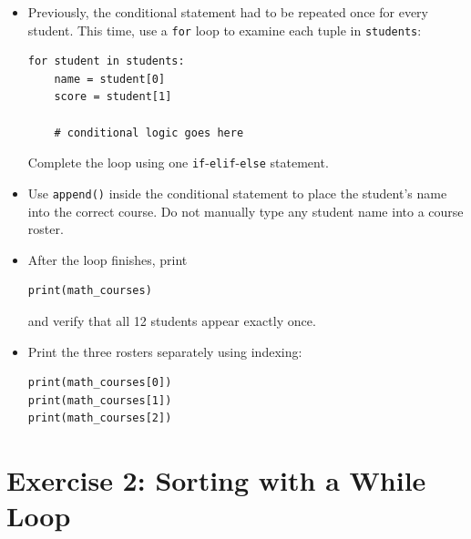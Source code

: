 \documentclass{article}
\begin{document}
\begin{enumerate}
\begin{itemize}
\item Previously, the conditional statement had to be
repeated once for every student.  This time, use a
\texttt{for} loop to examine each tuple in
\texttt{students}:

\begin{verbatim}
for student in students:
    name = student[0]
    score = student[1]

    # conditional logic goes here
\end{verbatim}

Complete the loop using one
\texttt{if}-\texttt{elif}-\texttt{else} statement.

\item Use \texttt{append()} inside the conditional statement
to place the student's name into the correct course.
Do not manually type any student name into a course roster.

\item After the loop finishes, print

\begin{verbatim}
print(math_courses)
\end{verbatim}

and verify that all 12 students appear exactly once.

\item Print the three rosters separately using indexing:

\begin{verbatim}
print(math_courses[0])
print(math_courses[1])
print(math_courses[2])
\end{verbatim}

\end{itemize}
\end{enumerate}


\section{Exercise 2: Sorting with a While Loop}
\end{document}
